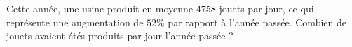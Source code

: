 
\begin{exercice}\label{exosmath-0231}

Cette année, une usine produit en moyenne $4758$ jouets par jour, ce qui représente une augmentation de $52\%$ par rapport à l'année passée. Combien de jouets avaient étés produits par jour l'année passée ?


\end{exercice}
